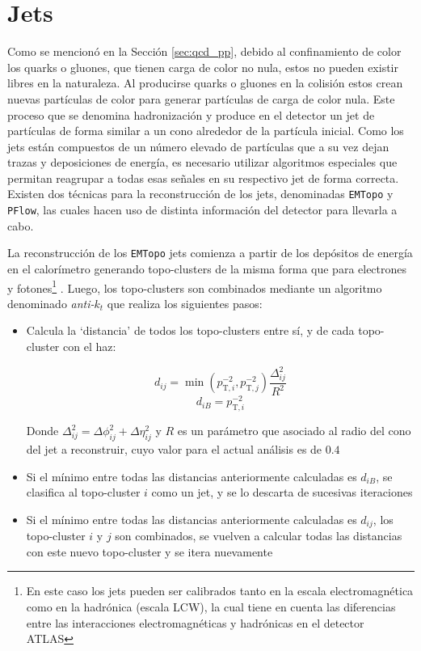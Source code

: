 \section{Jets}

Como se mencionó en la Sección \ref{sec:qcd_pp}, debido al confinamiento de color los quarks o gluones, que tienen carga de color no nula, estos no pueden existir libres en la naturaleza. Al producirse quarks o gluones en la colisión estos crean nuevas partículas de color para generar partículas de carga de color nula. Este proceso que se denomina hadronización y produce en el detector un jet de partículas de forma similar a un cono alrededor de la partícula inicial. Como los jets están compuestos de un número elevado de partículas que a su vez dejan trazas y deposiciones de energía, es necesario utilizar algoritmos especiales que permitan reagrupar a todas esas señales en su respectivo jet de forma correcta. Existen dos técnicas para la reconstrucción de los jets, denominadas \texttt{EMTopo} y \texttt{PFlow}, las cuales hacen uso de distinta información del detector para llevarla a cabo. 

La reconstrucción de los \texttt{EMTopo} jets comienza a partir de los depósitos de energía en el calorímetro generando topo-clusters de la misma forma que para electrones y fotones\footnote{En este caso los jets pueden ser calibrados tanto en la escala electromagnética como en la hadrónica (escala LCW), la cual tiene en cuenta las diferencias entre las interacciones electromagnéticas y hadrónicas en el detector ATLAS} \cite{Lampl:1099735}. Luego, los topo-clusters son combinados mediante un algoritmo denominado \textit{anti-$k_t$} \cite{Cacciari:2008gp} que realiza los siguientes pasos:

\begin{itemize}
	\item Calcula la `distancia' de todos los topo-clusters entre sí, y de cada topo-cluster con el haz:

	\begin{equation}
		d_{ij} = \min(p_{\text{T},i}^{-2}, p_{\text{T},j}^{-2})\frac{\Delta_{ij}^{2}}{R^{2}}
	\end{equation}
	\begin{equation}
		d_{iB} = p_{\text{T},i}^{-2}
	\end{equation}

	Donde $\Delta_{ij}^{2} = \Delta\phi_{ij}^{2} + \Delta\eta_{ij}^{2}$ y $R$ es un parámetro que asociado al radio del cono del jet a reconstruir, cuyo valor para el actual análisis es de $0.4$

	\item Si el mínimo entre todas las distancias anteriormente calculadas es $d_{iB}$, se clasifica al topo-cluster $i$ como un jet, y se lo descarta de sucesivas iteraciones

	\item Si el mínimo entre todas las distancias anteriormente calculadas es $d_{ij}$, los topo-cluster $i$ y $j$ son combinados, se vuelven a calcular todas las distancias con este nuevo topo-cluster y se itera nuevamente 

\end{itemize}

